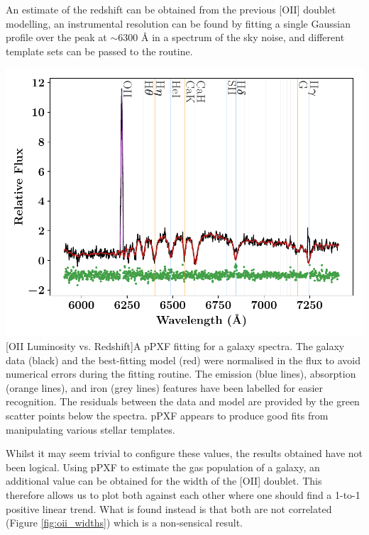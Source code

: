\documentclass[12pt, twocolumn]{revtex4}    %
\begin{document}
An estimate of the redshift can be obtained from the previous [OII] doublet modelling, an instrumental resolution can be found by fitting a single Gaussian profile over the peak at $\sim6300$ {\AA} in a spectrum of the sky noise, and different template sets can be passed to the routine. 



\begin{center}
\includegraphics[width=1.0\linewidth]{data/cube_1804_fitted}
[OII Luminosity vs. Redshift]{A pPXF fitting for a galaxy spectra. The galaxy data (black) and  the best-fitting model (red) were normalised in the flux to avoid numerical errors during the fitting routine. The emission (blue lines), absorption (orange lines), and iron (grey lines) features have been labelled for easier recognition. The residuals between the data and model are provided by the green scatter points below the spectra. pPXF appears to produce good fits from manipulating various stellar templates.}
\label{fig:ppxf_spectra}
\end{center}

Whilst it may seem trivial to configure these values, the results obtained have not been logical. Using pPXF to estimate the gas population of a galaxy, an additional value can be obtained for the width of the [OII] doublet. This therefore allows us to plot both against each other where one should find a 1-to-1 positive linear trend. What is found instead is that both are not correlated (Figure \ref{fig:oii_widths}) which is a non-sensical result. 
\end{document}
